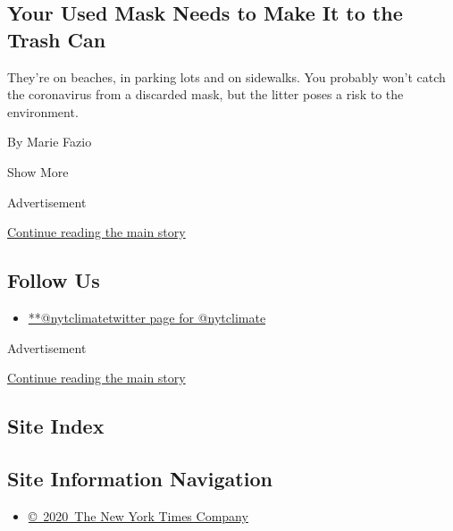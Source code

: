 \begin{enumerate}
  \hypertarget{your-used-mask-needs-to-make-it-to-the-trash-can}{%
  \subsection{Your Used Mask Needs to Make It to the Trash
  Can}\label{your-used-mask-needs-to-make-it-to-the-trash-can}}

  They're on beaches, in parking lots and on sidewalks. You probably
  won't catch the coronavirus from a discarded mask, but the litter
  poses a risk to the environment.

  By Marie Fazio
\end{enumerate}

Show More

Advertisement

\protect\hyperlink{after-mid2}{Continue reading the main story}

\hypertarget{follow-us}{%
\subsection{Follow Us}\label{follow-us}}

\begin{itemize}
\tightlist
\item
  \href{https://twitter.com/nytclimate}{**@nytclimatetwitter page for
  @nytclimate}
\end{itemize}

Advertisement

\protect\hyperlink{after-mktg}{Continue reading the main story}

\hypertarget{site-index}{%
\subsection{Site Index}\label{site-index}}

\hypertarget{site-information-navigation}{%
\subsection{Site Information
Navigation}\label{site-information-navigation}}

\begin{itemize}
\tightlist
\item
  \href{https://help.nytimes3xbfgragh.onion/hc/en-us/articles/115014792127-Copyright-notice}{©~2020~The
  New York Times Company}
\end{itemize}

